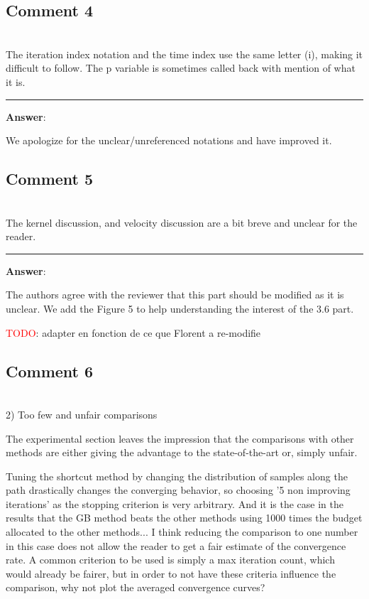 \documentclass{scrartcl}
\newcommand{\todo}{\textcolor{red}{TODO}}
\begin{document}
\subsection{Comment 4}
\hrulefill\\

The iteration index notation and the time index use the same letter (i), making it difficult to follow. The p variable is sometimes called back with mention of what it is.

\rule{\linewidth}{.1pt}
\textbf{Answer}:

We apologize for the unclear/unreferenced notations and have improved it.

\subsection{Comment 5}
\hrulefill\\

The kernel discussion, and velocity discussion are a bit breve and unclear for the reader.

\rule{\linewidth}{.1pt}
\textbf{Answer}:

The authors agree with the reviewer that this part should be modified as it is unclear. We add the Figure 5 to help understanding the interest of the 3.6 part.

\todo : adapter en fonction de ce que Florent a re-modifie

\subsection{Comment 6}
\hrulefill\\

2) Too few and unfair comparisons

The experimental section leaves the impression that the comparisons with other methods are either giving the advantage to the state-of-the-art or, simply unfair. 

Tuning the shortcut method by changing the distribution of samples along the path drastically changes the converging behavior, so choosing '5 non improving iterations' as the stopping criterion is very arbitrary. And it is the case in the results that the GB method beats the other methods using 1000 times the budget allocated to the other methods... I think reducing the comparison to one number in this case does not allow the reader to get a fair estimate of the convergence rate. A common criterion to be used is simply a max iteration count, which would already be fairer, but in order to not have these criteria influence the comparison, why not plot the averaged convergence curves?
\end{document}
